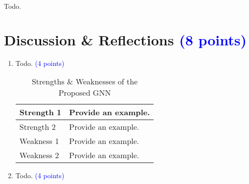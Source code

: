 \documentclass[conference]{IEEEtran}
\begin{document}
\textcolor{ashgrey}{Todo}.


\section{Discussion \& Reflections \textcolor{blue}{(8 points)}}

\begin{enumerate}[label=\alph*)]
\item \textcolor{ashgrey}{Todo}. \textcolor{blue}{(4 points)}

\begin{table}[ht!]
\renewcommand{\arraystretch}{1.3}
\centering
\caption{Strengths \& Weaknesses of the Proposed GNN}
\begin{tabular}{|p{2.8cm}|p{5cm}|}
\hline
Strength 1 & Provide an example. \\
\hline
Strength 2 & Provide an example. \\
\hline
Weakness 1 & Provide an example. \\
\hline
Weakness 2 & Provide an example. \\
\hline
\end{tabular}
\label{tab:reflections}
\end{table}

\item \textcolor{ashgrey}{Todo}. \textcolor{blue}{(4 points)}

\end{enumerate}



\thispagestyle{fancy} %
\fancyhf{} %
\fancyfoot[C]{\thepage} %



\end{document}
